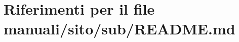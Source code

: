 \hypertarget{manuali_2sito_2sub_2README_8md}{}\section{Riferimenti per il file manuali/sito/sub/\+R\+E\+A\+D\+ME.md}
\label{manuali_2sito_2sub_2README_8md}
